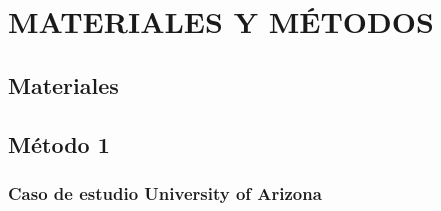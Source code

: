 \chapter{MATERIALES Y MÉTODOS}


\section{Materiales}

\section{Método 1}


\subsection{Caso de estudio University of Arizona}


